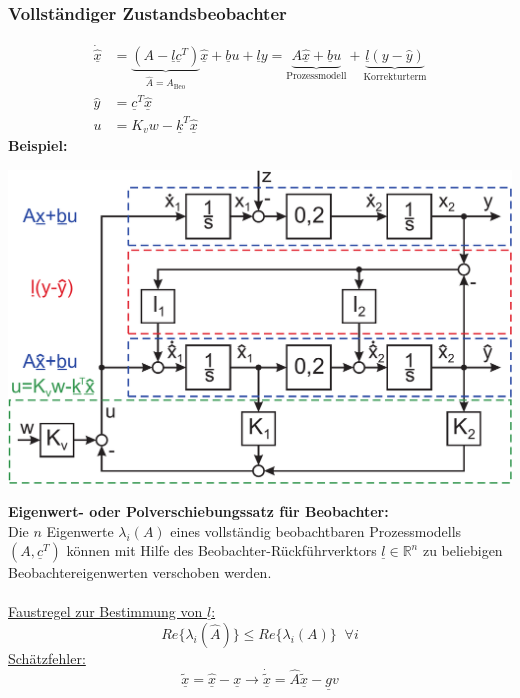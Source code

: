 \documentclass[a4paper,twocolumn,10pt]{article}
\begin{document}
\subsubsection{Vollständiger Zustandsbeobachter}
\begin{equation*}
\begin{split}
\underline{\dot{\hat{x}}}&=\underbrace{(A-\underline{l}\underline{c}^T)}_{\hat{A}=A_{\text{Beo}}}\underline{\hat{x}}+\underline{b}u+\underline{l}y=\underbrace{A\underline{\hat{x}}+\underline{b}u}_{\text{Prozessmodell}}+\underbrace{\underline{l}(y-\hat{y})}_{\text{Korrekturterm}}\\
\hat{y}&=\underline{c}^T\underline{\hat{x}}\\
u&=K_vw-\underline{k}^T\underline{\hat{x}}
\end{split}
\end{equation*}
\textbf{Beispiel:}
\begin{center}
\includegraphics[width=0.95\columnwidth]{Grafiken/Vollst_Zustandsbeobachter}
\end{center}
\textbf{Eigenwert- oder Polverschiebungssatz für Beobachter:}\\
Die $n$ Eigenwerte $\lambda_i(A)$ eines vollständig beobachtbaren Prozessmodells $(A,\underline{c}^T)$ können mit Hilfe des Beobachter-Rückführverktors $\underline{l}\in\mathbb{R}^n$ zu beliebigen Beobachtereigenwerten verschoben werden.\\\\
\underline{Faustregel zur Bestimmung von $\underline{l}$:}
\begin{equation*}
Re\{\lambda_i(\hat{A})\}\leq Re\{\lambda_i(A)\}\;\;\forall i
\end{equation*}
\underline{Schätzfehler:}
\begin{equation*}
\underline{\tilde{x}}=\underline{\hat{x}}-\underline{x}\rightarrow \underline{\dot{\tilde{x}}}=\hat{A}\underline{\tilde{x}}-\underline{g}v
\end{equation*}
\end{document}
